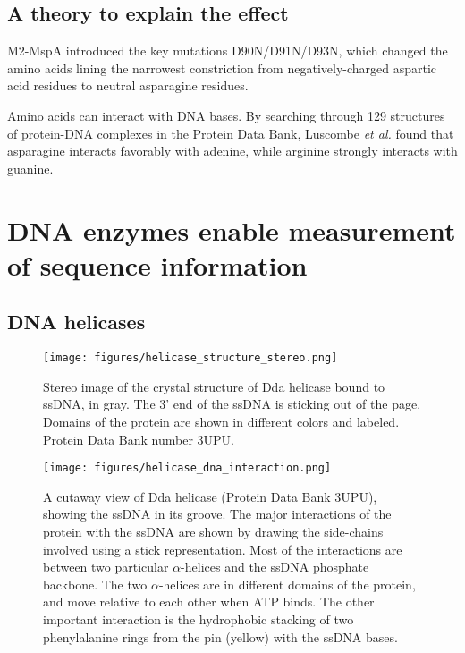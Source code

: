 \subsection{A theory to explain the effect}

M2-MspA introduced the key mutations D90N/D91N/D93N, which changed the amino acids lining the narrowest constriction from negatively-charged aspartic acid residues to neutral asparagine residues.

Amino acids can interact with DNA bases.  By searching through 129 structures of protein-DNA complexes in the Protein Data Bank, Luscombe \textit{et al.} \citep{Luscombe2001} found that asparagine interacts favorably with adenine, while arginine strongly interacts with guanine.


\section{DNA enzymes enable measurement of sequence information}


\subsection{DNA helicases}

\begin{figure}[h]
\begin{centering}
\texttt{[image: figures/helicase\_structure\_stereo.png]}
\caption[Dda helicase structure]{Stereo image of the crystal structure of Dda helicase bound to ssDNA, in gray.  The 3' end of the ssDNA is sticking out of the page.  Domains of the protein are shown in different colors and labeled.  Protein Data Bank number 3UPU. \citep{He2012}}
\label{fig:helicase_stereo}
\end{centering}
\end{figure}

\begin{figure}[h]
\begin{centering}
\texttt{[image: figures/helicase\_dna\_interaction.png]}
\caption[Dda helicase: interactions with ssDNA]{A cutaway view of Dda helicase (Protein Data Bank 3UPU), showing the ssDNA in its groove.  The major interactions of the protein with the ssDNA are shown by drawing the side-chains involved using a stick representation.  Most of the interactions are between two particular $\alpha$-helices and the ssDNA phosphate backbone.  The two $\alpha$-helices are in different domains of the protein, and move relative to each other when ATP binds.  The other important interaction is the hydrophobic stacking of two phenylalanine rings from the pin (yellow) with the ssDNA bases.}
\label{fig:helicase_ssDNA_interactions}
\end{centering}
\end{figure}

